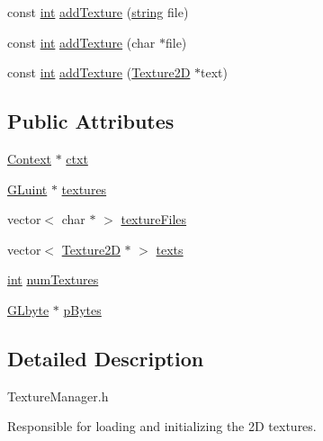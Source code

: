 \begin{DoxyCompactItemize}
\item 
const \hyperlink{_s_d_l__thread_8h_a6a64f9be4433e4de6e2f2f548cf3c08e}{int} \hyperlink{class_texture_manager_aed31054d5583505dacdd3211fe4298ce}{add\-Texture} (\hyperlink{_g_l_e_w_2glew_8h_a06b88fc81ad0b30d1512e9609e3d7c82}{string} file)
\item 
const \hyperlink{_s_d_l__thread_8h_a6a64f9be4433e4de6e2f2f548cf3c08e}{int} \hyperlink{class_texture_manager_ab7727e272250c8630de7663ea71623d6}{add\-Texture} (char $\ast$file)
\item 
const \hyperlink{_s_d_l__thread_8h_a6a64f9be4433e4de6e2f2f548cf3c08e}{int} \hyperlink{class_texture_manager_af1e8364f68f09d21225db23e394ad608}{add\-Texture} (\hyperlink{class_texture2_d}{Texture2\-D} $\ast$text)
\end{DoxyCompactItemize}
\subsection*{Public Attributes}
\begin{DoxyCompactItemize}
\item 
\hyperlink{class_context}{Context} $\ast$ \hyperlink{class_texture_manager_a772982cc59daac34255975d0c5dbcea6}{ctxt}
\item 
\hyperlink{_g_l_e_w_2glew_8h_a68c4714e43d8e827d80759f9cb864f3c}{G\-Luint} $\ast$ \hyperlink{class_texture_manager_addeef5e84ca3c522d910fe37618a20b7}{textures}
\item 
vector$<$ char $\ast$ $>$ \hyperlink{class_texture_manager_a3a82a693ed6a11d179c5014ba70c1dc1}{texture\-Files}
\item 
vector$<$ \hyperlink{class_texture2_d}{Texture2\-D} $\ast$ $>$ \hyperlink{class_texture_manager_a11e36cd38c0ede4b05d26f3701ad879c}{texts}
\item 
\hyperlink{_s_d_l__thread_8h_a6a64f9be4433e4de6e2f2f548cf3c08e}{int} \hyperlink{class_texture_manager_a683f7d58d8b19498b4d68a0f481c3290}{num\-Textures}
\item 
\hyperlink{_g_l_e_w_2glew_8h_a0a9e8b1f1d9c4bcf1c0bc5d5d4e3608a}{G\-Lbyte} $\ast$ \hyperlink{class_texture_manager_a8cc5e3a2bfeecb26c2b921c2ddbfd1cf}{p\-Bytes}
\end{DoxyCompactItemize}


\subsection{Detailed Description}
Texture\-Manager.\-h

Responsible for loading and initializing the 2\-D textures.

